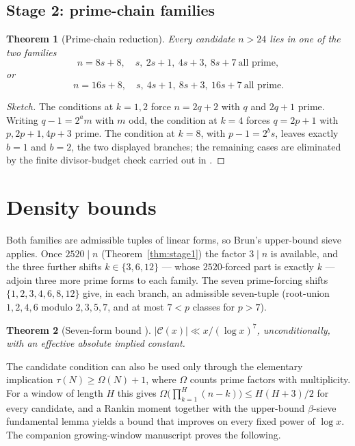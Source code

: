 \documentclass[11pt]{article}
\newtheorem{theorem}{Theorem}[section]
\theoremstyle{remark}
\newcommand{\C}{\mathcal{C}}
\newcommand{\tu}{\tau}
\newcommand{\Om}{\Omega}
\begin{document}
\subsection*{Stage 2: prime-chain families}

\begin{theorem}[Prime-chain reduction]\label{thm:stage2}
Every candidate $n>24$ lies in one of the two families
\[
  n=8s+8,\quad s,\ 2s+1,\ 4s+3,\ 8s+7\ \text{all prime},
\]
or
\[
  n=16s+8,\quad s,\ 4s+1,\ 8s+3,\ 16s+7\ \text{all prime}.
\]
\end{theorem}

\begin{proof}[Sketch]
The conditions at $k=1,2$ force $n=2q+2$ with $q$ and $2q+1$ prime. Writing
$q-1=2^a m$ with $m$ odd, the condition at $k=4$ forces $q=2p+1$ with
$p,2p+1,4p+3$ prime. The condition at $k=8$, with $p-1=2^b s$, leaves exactly $b=1$
and $b=2$, the two displayed branches; the remaining cases are eliminated by the
finite divisor-budget check carried out in \cite{HughesChains}.
\end{proof}

\section{Density bounds}

Both families are admissible tuples of linear forms, so Brun's upper-bound sieve
applies. Once $2520\mid n$ (Theorem~\ref{thm:stage1}) the factor $3\mid n$ is
available, and the three further shifts $k\in\{3,6,12\}$ — whose $2520$-forced part is
exactly $k$ — adjoin three more prime forms to each family. The seven prime-forcing
shifts $\{1,2,3,4,6,8,12\}$ give, in each branch, an admissible seven-tuple
(root-union $1,2,4,6$ modulo $2,3,5,7$, and at most $7<p$ classes for $p>7$).

\begin{theorem}[Seven-form bound \cite{HughesChains}]\label{thm:seven}
$|\C(x)|\ll x/(\log x)^{7}$, unconditionally, with an effective absolute implied
constant.
\end{theorem}

The candidate condition can also be used only through the elementary implication
$\tu(N)\ge\Om(N)+1$, where $\Om$ counts prime factors with multiplicity. For a
window of length $H$ this gives $\Om\!\bigl(\prod_{k=1}^{H}(n-k)\bigr)\le H(H+3)/2$
for every candidate, and a Rankin moment together with the upper-bound
$\beta$-sieve fundamental lemma yields a bound that improves on every fixed power of
$\log x$. The companion growing-window manuscript proves the following.
\end{document}
